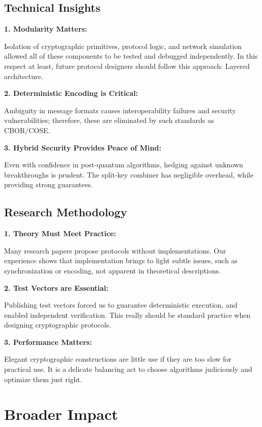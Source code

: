 \documentclass[12pt,a4paper]{report}
\begin{document}
\subsection{Technical Insights}

\textbf{1. Modularity Matters:}

Isolation of cryptographic primitives, protocol logic, and network simulation allowed all of these components to be tested and debugged independently. In this respect at least, future protocol designers should follow this approach:
Layered architecture.

\textbf{2. Deterministic Encoding is Critical:}

Ambiguity in message formats causes interoperability failures and security vulnerabilities; therefore, these are eliminated by such standards as CBOR/COSE.

\textbf{3. Hybrid Security Provides Peace of Mind:}

Even with confidence in post-quantum algorithms, hedging against unknown breakthroughs is prudent. The split-key combiner has negligible overhead, while providing
strong guarantees.

\subsection{Research Methodology}

\textbf{1. Theory Must Meet Practice:}

Many research papers propose protocols without implementations. Our experience
shows that implementation brings to light subtle issues, such as synchronization or encoding, not
apparent in theoretical descriptions.

\textbf{2. Test Vectors are Essential:}

Publishing test vectors forced us to guarantee deterministic execution, and enabled independent verification. This really should be standard practice when designing cryptographic protocols.

\textbf{3. Performance Matters:}

Elegant cryptographic constructions are little use if they are too slow for practical use. It is a delicate balancing act to choose algorithms judiciously and optimize them just right.

\section{Broader Impact}
\end{document}
